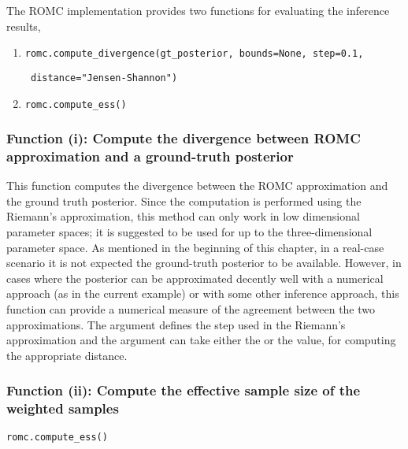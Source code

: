 The ROMC implementation provides two functions for evaluating the inference results,

\begin{enumerate}[label=(\roman*)]
\item \texttt{romc.compute_divergence(gt_posterior, bounds=None, step=0.1,}

      \texttt{                        distance="Jensen-Shannon")}

\item \texttt{romc.compute_ess()}
\end{enumerate}

\subsubsection*{Function (i): Compute the divergence between ROMC approximation and a ground-truth posterior}


\vspace{5mm}

\noindent
This function computes the divergence between the ROMC approximation
and the ground truth posterior. Since the computation is performed
using the Riemann's approximation, this method can only work in low
dimensional parameter spaces; it is suggested to be used for up to the
three-dimensional parameter space. As mentioned in the beginning of
this chapter, in a real-case scenario it is not expected the
ground-truth posterior to be available. However, in cases where the
posterior can be approximated decently well with a numerical approach
(as in the current example) or with some other inference approach,
this function can provide a numerical measure of the agreement
between the two approximations. The argument  defines
the step used in the Riemann's approximation and the argument
 can take either the  or the
 value, for computing the appropriate distance.

\subsubsection*{Function (ii): Compute the effective sample size of the weighted samples}

\texttt{romc.compute_ess()}
\vspace{5mm}

